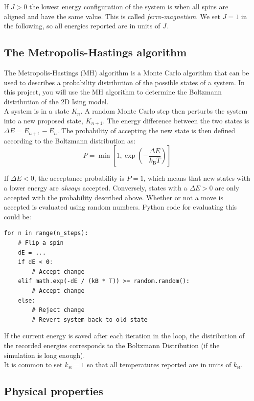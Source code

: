\documentclass{article}
\begin{document}
If $J > 0$ the lowest energy configuration of the system is when all spins are aligned and have the same value.
This is called \textit{ferro-magnetism}.
We set $J = 1$ in the following, so all energies reported are in units of $J$.

\subsection{The Metropolis-Hastings algorithm}

The Metropolis-Hastings (MH) algorithm is a Monte Carlo algorithm that can be used to describes a probability distribution of the possible states of a system.
In this project, you will use the MH algorithm to determine the Boltzmann distribution of the 2D Ising model.\\

A system is in a state $K_n$.
A random Monte Carlo step then perturbs the system into a new proposed state, $K_{n+1}$.
The energy difference between the two states is $\Delta E = E_{n+1} - E_n$.
The probability of accepting the new state is then defined according to the Boltzmann distribution as:
\begin{equation}
P = \min \left[1, \exp \left(-\frac{\Delta E}{k_{\mathrm{B}}T}\right) \right]
\end{equation} 

If $\Delta E < 0$, the acceptance probability is $P = 1$, which means that new states with a lower energy are \textit{always} accepted.
Conversely, states with a $\Delta E > 0 $ are only accepted with the probability described above.
Whether or not a move is accepted is evaluated using random numbers.
Python code for evaluating this could be:
\begin{lstlisting}
for n in range(n_steps):
    # Flip a spin
    dE = ...
    if dE < 0:
        # Accept change
    elif math.exp(-dE / (kB * T)) >= random.random():
        # Accept change
    else:
        # Reject change
        # Revert system back to old state
\end{lstlisting}

If the current energy is saved after each iteration in the loop, the distribution of the recorded energies corresponds to the Boltzmann Distribution (if the simulation is long enough).\\

It is common to set $k_{\mathrm{B}} = 1$ so that all temperatures reported are in units of $k_{\mathrm{B}}$.

\newpage
\subsection{Physical properties}
\end{document}
